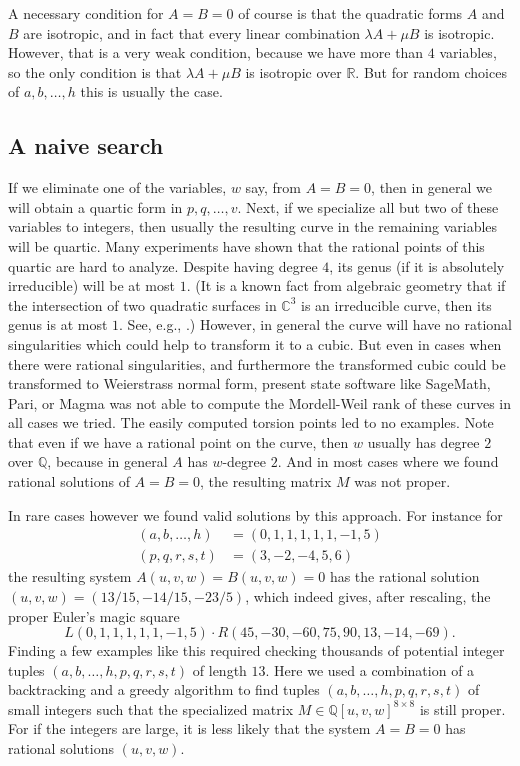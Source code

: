 \documentclass[12pt]{amsart}
\theoremstyle{definition}
\newcommand{\CC}{\mathbb C}
\newcommand{\QQ}{\mathbb Q}
\newcommand{\RR}{\mathbb R}
\begin{document}
A necessary condition for $A=B=0$ of course is that the quadratic
forms $A$ and $B$ are isotropic, and in fact that every linear
combination $\lambda A+\mu B$ is isotropic. However, that is a very
weak condition, because we have more than $4$ variables, so the only
condition is that $\lambda A+\mu B$ is isotropic over $\RR$. But for
random choices of $a,b,\dots,h$ this is usually the case.
\subsection{A naive search}
If we eliminate one of the variables, $w$ say, from $A=B=0$, then in
general we will obtain a quartic form in $p,q,\dots,v$. Next, if we
specialize all but two of these variables to integers, then usually
the resulting curve in the remaining variables will be quartic. Many
experiments have shown that the rational points of this quartic are
hard to analyze. Despite having degree $4$, its genus (if it is
absolutely irreducible) will be at most $1$. (It is a known fact from
algebraic geometry that if the intersection of two quadratic surfaces
in $\CC^3$ is an irreducible curve, then its genus is at most
$1$. See, e.g., \cite[Lecture 22, Pencils of
Quadrics]{harris:ag_first_course}.) However, in general the curve will
have no rational singularities which could help to transform it to a
cubic. But even in cases when there were rational singularities, and
furthermore the transformed cubic could be transformed to Weierstrass
normal form, present state software like SageMath, Pari, or Magma was
not able to compute the Mordell-Weil rank of these curves in all cases
we tried. The easily computed torsion points led to no examples. Note
that even if we have a rational point on the curve, then $w$ usually
has degree $2$ over $\QQ$, because in general $A$ has $w$-degree
$2$. And in most cases where we found rational solutions of $A=B=0$,
the resulting matrix $M$ was not proper.

In rare cases however we found valid solutions by this approach. For
instance for
\begin{align*}
  (a,b,\dots,h) &= (0, 1, 1, 1, 1, 1, -1, 5)\\
  (p,q,r,s,t) &= (3, -2, -4, 5, 6)
\end{align*}
the resulting system $A(u,v,w)=B(u,v,w)=0$ has the rational solution
$(u,v,w)=(13/15, -14/15, -23/5)$, which indeed gives, after rescaling,
the proper Euler's magic square
\[
  L(0, 1, 1, 1, 1, 1, -1, 5)\cdot R(45, -30, -60, 75, 90, 13, -14,
  -69).
\]
Finding a few examples like this required checking thousands of
potential integer tuples $(a,b,\dots,h,p,q,r,s,t)$ of length $13$.
Here we used a combination of a backtracking and a greedy algorithm to
find tuples $(a,b,\dots,h,p,q,r,s,t)$ of small integers such that the
specialized matrix $M\in\QQ[u,v,w]^{8\times 8}$ is still proper. For
if the integers are large, it is less likely that the system $A=B=0$
has rational solutions $(u, v, w)$.
\end{document}
